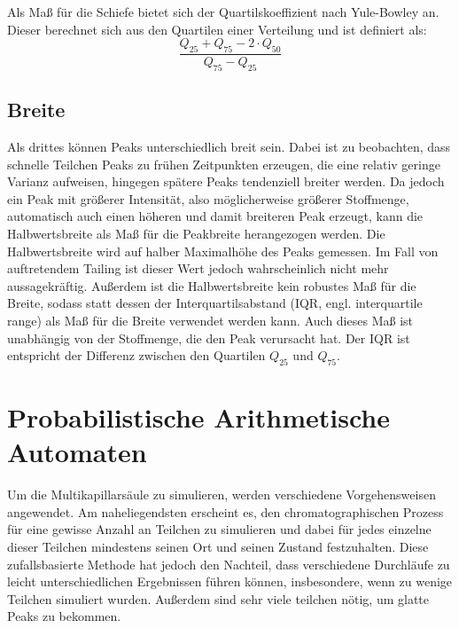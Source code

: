 Als Maß für die Schiefe bietet sich der Quartilskoeffizient nach Yule-Bowley an. Dieser berechnet sich aus den Quartilen einer Verteilung und ist definiert als: 
\begin{equation*}
\frac{Q_{25} + Q_{75} -2\cdot Q_{50} }{ Q_{75} - Q_{25}}
\end{equation*}

\subsection{Breite}
Als drittes können Peaks unterschiedlich breit sein. Dabei ist zu beobachten, dass schnelle Teilchen Peaks zu frühen Zeitpunkten erzeugen, die eine relativ geringe Varianz aufweisen, hingegen spätere Peaks tendenziell breiter werden.
Da jedoch ein Peak mit größerer Intensität, also möglicherweise größerer Stoffmenge, automatisch auch einen höheren und damit breiteren Peak erzeugt, kann die Halbwertsbreite als Maß für die Peakbreite herangezogen werden. Die Halbwertsbreite wird auf halber Maximalhöhe des Peaks gemessen. Im Fall von auftretendem Tailing ist dieser Wert jedoch wahrscheinlich nicht mehr aussagekräftig. Außerdem ist die Halbwertsbreite kein robustes Maß für die Breite, sodass statt dessen der Interquartilsabstand (IQR, engl. interquartile range) als Maß für die Breite verwendet werden kann. Auch dieses Maß ist unabhängig von der Stoffmenge, die den Peak verursacht hat. Der IQR ist entspricht der Differenz zwischen den Quartilen $Q_{25}$ und $Q_{75}$.



\section{Probabilistische Arithmetische Automaten}
Um die Multikapillarsäule zu simulieren, werden verschiedene Vorgehensweisen angewendet. Am naheliegendsten erscheint es, den chromatographischen Prozess für eine gewisse Anzahl an Teilchen zu simulieren und dabei für jedes einzelne dieser Teilchen mindestens seinen Ort und seinen Zustand festzuhalten. Diese zufallsbasierte Methode hat jedoch den Nachteil, dass verschiedene Durchläufe zu leicht unterschiedlichen Ergebnissen führen können, insbesondere, wenn zu wenige Teilchen simuliert wurden.
Außerdem sind sehr viele teilchen nötig, um glatte Peaks zu bekommen.

